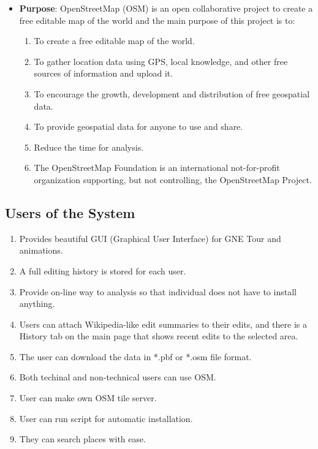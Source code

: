 \begin{itemize}
\item{\bf Purpose}: OpenStreetMap (OSM) is an open collaborative project to  create a free editable map of the world and the main purpose of this project is to:
\begin{enumerate}
\item  To  create a free editable map of the world.
\item To gather location data  using GPS, local knowledge, and other free sources of information and upload it.
\item  To encourage the growth, development and distribution of free geospatial data.
\item  To provide geospatial data for anyone to use and share.
\item Reduce the time for analysis.
\item The OpenStreetMap Foundation is an international not-for-profit organization supporting, but not controlling, the OpenStreetMap Project.
\end{enumerate}
\end{itemize}
\subsection{Users of the System}


\begin{enumerate}
\item Provides beautiful GUI (Graphical User Interface) for GNE Tour and animations.
\item A full editing history is stored for each user.
\item Provide on-line way to analysis so that individual does not have to
install anything.
\item Users can attach Wikipedia-like edit summaries to their edits, and there is a History tab on the main page that shows recent edits to the selected area.
\item The user can download the data in *.pbf or *.osm file format.
\item Both techinal and non-technical users can use OSM.
\item User can make own OSM tile server.
\item User can run script for automatic installation.
\item They can search places with ease.

\end{enumerate}


